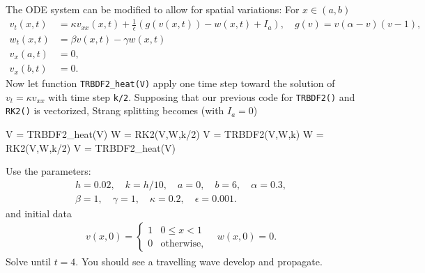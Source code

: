 \documentclass[12pt]{report}
\begin{document}
\newpage



\begin{problem}
    The ODE system can be modified to allow for spatial variations: For $x \in (a,b)$
\begin{align*}
v_t(x,t) &= \kappa v_{xx}(x,t)+  \frac 1 \epsilon \left( g(v(x,t)) - w(x,t) + I_a \right), \quad g(v) = v (\alpha - v) (v-1),\\
w_t(x,t) &= \beta v(x,t) - \gamma w(x,t)\\
v_x(a,t) & = 0,\\
v_x(b,t) & = 0.
\end{align*}
Now let function \verb`TRBDF2_heat(V)` apply one time step toward the solution of $v_t = \kappa v_{xx}$ with time step \verb`k/2`. Supposing that our previous code for \verb`TRBDF2()` and \verb`RK2()` is vectorized, Strang splitting becomes (with $I_a = 0$)
\begin{jllisting}
    V = TRBDF2_heat(V)
    W = RK2(V,W,k/2)
    V = TRBDF2(V,W,k)
    W = RK2(V,W,k/2)
    V = TRBDF2_heat(V)
\end{jllisting}
Use the parameters:
\begin{align*}
h = 0.02, \quad k = h/10, \quad a = 0, \quad b = 6, \quad \alpha = 0.3,\\
\beta = 1, \quad \gamma = 1, \quad \kappa = 0.2, \quad \epsilon = 0.001.
\end{align*}
and initial data
\begin{align*}
    v(x,0) = \begin{cases} 1 &0 \leq x < 1 \\
    0 & \text{otherwise},
    \end{cases} \quad w(x,0) = 0.
\end{align*}
Solve until $t = 4$.  You should see a travelling wave develop and propagate.
\end{problem}
\end{document}
